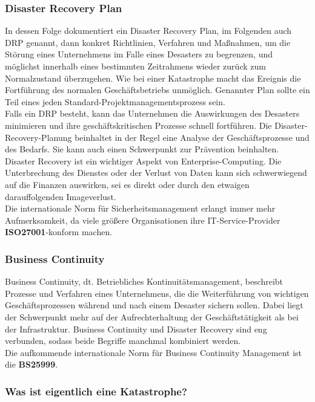\documentclass[letterpaper, 12pt]{article}
\let\tempsubsubsection\subsubsection
\renewcommand\subsubsection[1]{\vspace{0cm}\tempsubsubsection{#1}\vspace{0cm}}
\begin{document}
\subsubsection{Disaster Recovery Plan}

In dessen Folge dokumentiert ein Disaster Recovery Plan, im Folgenden auch DRP genannt, dann konkret Richtlinien, Verfahren und Maßnahmen, um die Störung eines Unternehmens im Falle eines Desasters zu begrenzen, und möglichst innerhalb eines bestimmten Zeitrahmens wieder zurück zum Normalzustand überzugehen. Wie bei einer Katastrophe macht das Ereignis die Fortführung des normalen Geschäftsbetriebs unmöglich. Genannter Plan sollte ein Teil eines jeden Standard-Projektmanagementsprozess sein. \\
Falls ein DRP besteht, kann das Unternehmen die Auswirkungen des Desasters minimieren und ihre geschäftskritischen Prozesse schnell fortführen. Die Disaster-Recovery-Planung beinhaltet in der Regel eine Analyse der Geschäftsprozesse und des Bedarfs. Sie kann auch einen Schwerpunkt zur Prävention beinhalten. Disaster Recovery ist ein wichtiger Aspekt von Enterprise-Computing. Die Unterbrechung des Dienstes oder der Verlust von Daten kann sich schwerwiegend auf die Finanzen auswirken, sei es direkt oder durch den etwaigen darauffolgenden Imageverlust. \\
Die internationale Norm für Sicherheitsmanagement erlangt immer mehr Aufmerksamkeit, da viele größere Organisationen ihre IT-Service-Provider \textbf{ISO27001}-konform machen.

\newpage

\subsubsection{Business Continuity}

Business Continuity, dt. Betriebliches Kontinuitätsmanagement, beschreibt Prozesse und Verfahren eines Unternehmens, die die Weiterführung von wichtigen Geschäftsprozessen während und nach einem Desaster sichern sollen. Dabei liegt der Schwerpunkt mehr auf der Aufrechterhaltung der Geschäftstätigkeit als bei der Infrastruktur. Business Continuity und Disaster Recovery sind eng verbunden, sodass beide Begriffe manchmal kombiniert werden. \\
Die aufkommende internationale Norm für Business Continuity Management ist die \textbf{BS25999}. \\

\subsubsection{Was ist eigentlich eine Katastrophe?}
\end{document}
